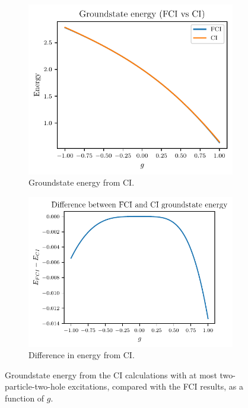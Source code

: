 \begin{figure}[htbp]
    \centering
    \begin{subfigure}[b]{0.45\linewidth}
        \centering
        \includegraphics[width=\textwidth]{figures/c_groundstate_energy.pdf}
        \caption{
            Groundstate energy from CI.\label{fig:c_groundstate}
        }
    \end{subfigure}
    \hfill
    \begin{subfigure}[b]{0.5\linewidth}
        \centering
        \includegraphics[width=\textwidth]{figures/c_groundstate_energy_diff.pdf}
        \caption{
            Difference in energy from CI.\label{fig:c_diff_groundstate}
        }
    \end{subfigure}
    \caption{
        Groundstate energy from the CI calculations with at most two-particle-two-hole excitations, compared with the FCI results, as a function of $g$.
    }
\end{figure}

